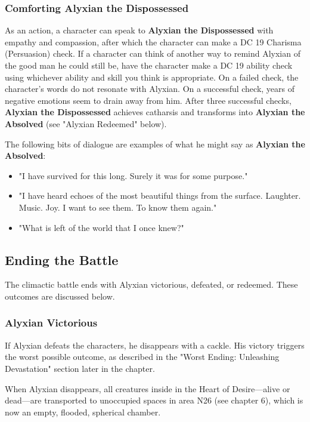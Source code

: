 \documentclass[10pt,a4paper,twoside,fancy,bg=print,twocolumn,openany,nodeprecatedcode]{dndbook}
\begin{document}
\subsubsection{Comforting Alyxian the Dispossessed}
As an action, a character can speak to \textbf{Alyxian the Dispossessed} with empathy and compassion, after which the character can make a DC 19 Charisma (Persuasion) check. If a character can think of another way to remind Alyxian of the good man he could still be, have the character make a DC 19 ability check using whichever ability and skill you think is appropriate. On a failed check, the character's words do not resonate with Alyxian. On a successful check, years of negative emotions seem to drain away from him. After three successful checks, \textbf{Alyxian the Dispossessed} achieves catharsis and transforms into \textbf{Alyxian the Absolved} (see "Alyxian Redeemed" below).

The following bits of dialogue are examples of what he might say as \textbf{Alyxian the Absolved}:


\begin{itemize}
\item "I have survived for this long. Surely it was for some purpose."
\item "I have heard echoes of the most beautiful things from the surface. Laughter. Music. Joy. I want to see them. To know them again."
\item "What is left of the world that I once knew?"
\end{itemize}

\subsection{Ending the Battle}
The climactic battle ends with Alyxian victorious, defeated, or redeemed. These outcomes are discussed below.

\subsubsection{Alyxian Victorious}
If Alyxian defeats the characters, he disappears with a cackle. His victory triggers the worst possible outcome, as described in the "Worst Ending: Unleashing Devastation" section later in the chapter.

When Alyxian disappears, all creatures inside in the Heart of Desire—alive or dead—are transported to unoccupied spaces in area N26 (see chapter 6), which is now an empty, flooded, spherical chamber.
\end{document}

